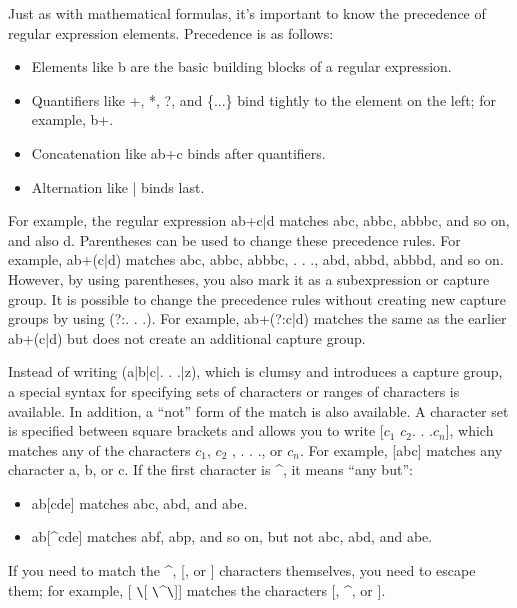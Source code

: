Just as with mathematical formulas, it’s important to know the precedence of regular expression elements. Precedence is as follows:

\begin{itemize}
\item
Elements like b are the basic building blocks of a regular expression.

\item
Quantifiers like +, *, ?, and \{...\} bind tightly to the element on the left; for example, b+.

\item
Concatenation like ab+c binds after quantifiers.

\item
Alternation like | binds last.
\end{itemize}

For example, the regular expression ab+c|d matches abc, abbc, abbbc, and so on, and also d. Parentheses can be used to change these precedence rules. For example, ab+(c|d) matches abc, abbc, abbbc, . . ., abd, abbd, abbbd, and so on. However, by using parentheses, you also mark it as a subexpression or capture group. It is possible to change the precedence rules without creating new capture groups by using (?:. . .). For example, ab+(?:c|d) matches the same as the earlier ab+(c|d) but does not create an additional capture group.


Instead of writing (a|b|c|. . .|z), which is clumsy and introduces a capture group, a special syntax for specifying sets of characters or ranges of characters is available. In addition, a “not” form of the match is also available. A character set is specified between square brackets and allows you to write [$c_1$ $c_2$. . .$c_n$], which matches any of the characters $c_1$, $c_2$ , . . ., or $c_n$. For example, [abc] matches any character a, b, or c. If the first character is \^{}, it means “any but”:

\begin{itemize}
\item
ab[cde] matches abc, abd, and abe.

\item
ab[\^{}cde] matches abf, abp, and so on, but not abc, abd, and abe.
\end{itemize}

If you need to match the \^{}, [, or ] characters themselves, you need to escape them; for example, [ \verb|\|[ \verb|\|\^{}\verb|\|]] matches the characters [, \^{}, or ].

